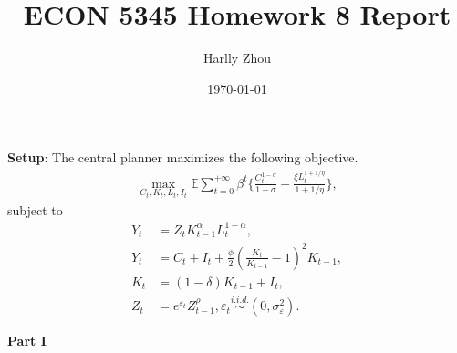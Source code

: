 \documentclass[12pt]{article}
\title{ECON 5345 Homework 8 Report}
\author{Harlly Zhou}
\date{\today}
\begin{document}
\maketitle

\noindent\textbf{Setup}: The central planner maximizes the following objective.
\begin{align*}
    \max_{C_t, K_t, L_t, I_t} \mathbb{E} \sum_{t=0}^{+\infty} \beta^t \bigg\{\frac{C_t^{1-\sigma}}{1-\sigma} - \frac{\xi L_t^{1+1/\eta}}{1+1/\eta}\bigg\},
\end{align*}
subject to
\begin{align*}
    Y_t &= Z_t K_{t-1}^{\alpha} L_t^{1-\alpha},\\
    Y_t &= C_t + I_t + \frac{\phi}{2} \left( \frac{K_t}{K_{t-1}} - 1 \right)^2 K_{t-1},\\
    K_t &= (1-\delta)K_{t-1} + I_t,\\
    Z_t &= e^{\varepsilon_t}Z_{t-1}^{\rho}, \varepsilon_t \overset{i.i.d.}{\sim} (0, \sigma_\varepsilon^2).
\end{align*}

\newpage
\noindent\textbf{Part I}
\end{document}
